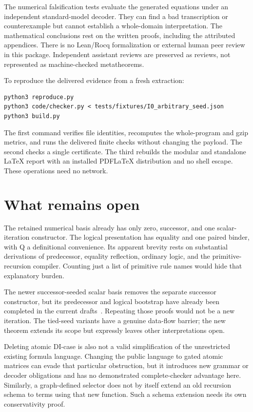 The numerical falsification tests evaluate the generated equations under
an independent standard-model decoder. They can find a bad transcription
or counterexample but cannot establish a whole-domain interpretation.
The mathematical conclusions rest on the written proofs, including the
attributed appendices. There is no Lean/Rocq formalization or external
human peer review in this package. Independent assistant reviews are
preserved as reviews, not represented as machine-checked metatheorems.

To reproduce the delivered evidence from a fresh extraction:
\begin{lstlisting}
python3 reproduce.py
python3 code/checker.py < tests/fixtures/I0_arbitrary_seed.json
python3 build.py
\end{lstlisting}
The first command verifies file identities, recomputes the whole-program
and gzip metrics, and runs the delivered finite checks without changing
the payload. The second checks a single certificate. The third rebuilds
the modular and standalone LaTeX report with an installed PDFLaTeX
distribution and no shell escape. These operations need no network.



\section{What remains open}

The retained numerical basis already has only zero, successor, and one
scalar-iteration constructor. The logical presentation has equality and
one paired binder, with Q a definitional convenience. Its apparent brevity
rests on substantial derivations of predecessor, equality reflection,
ordinary logic, and the primitive-recursion compiler. Counting just a
list of primitive rule names would hide that explanatory burden.

The newer successor-seeded scalar basis removes the separate successor
constructor, but its predecessor and logical bootstrap have already been
completed in the current drafts~\cite{scalar,completion,transient}.
Repeating those proofs would not be a new iteration. The tied-seed
variants have a genuine data-flow barrier; the new theorem extends its
scope but expressly leaves other interpretations open.

Deleting atomic DI-case is also not a valid simplification of the
unrestricted existing formula language. Changing the public language to
gated atomic matrices can evade that particular obstruction, but it
introduces new grammar or decoder obligations and has no demonstrated
complete-checker advantage here. Similarly, a graph-defined selector does
not by itself extend an old recursion schema to terms using that new
function. Such a schema extension needs its own conservativity proof.

